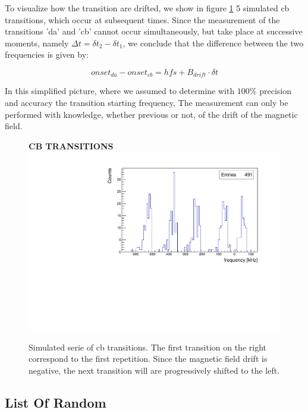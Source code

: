 \documentclass[11pt,a4paper,oneside]{article}
\newcommand{\commento}[1]{{\color{purple}{#1}}\vspace{10pt}}
\begin{document}
To visualize how the transition are drifted, we show in figure \ref{fig:MovingOnset} 5 simulated cb transitions, which occur at subsequent times. Since the measurement of the transitions 'da' and 'cb' cannot occur simultaneously, but take place at successive moments, namely $\Delta t = \delta t_{2} - \delta t_{1}$, we conclude that the difference between the two frequencies is given by:

\begin{equation} \label{eq:hfsmes}
onset_{da} - onset_{cb} = hfs + B_{drift} \cdot \delta t
\end{equation}


In this simplified picture, where we assumed to determine with $100 \%$ precision and accuracy the transition starting frequency, The measurement can only be performed with knowledge, whether previous or not, of the drift of the magnetic field.

\begin{figure}[!h]
\centering
\textbf{CB TRANSITIONS} \\
\includegraphics[width = 1\textwidth]{seriesoftransitions.pdf}
\caption[cb repetitions]{Simulated serie of cb transitions. The first transition on the right correspond to the first repetition. Since the magnetic field drift is negative, the next transition will are progressively shifted to the left.}
\label{fig:MovingOnset}
\end{figure}

\newpage
\subsection{List Of Random}
\commento{spiegare in dettaglio le motivazioni/come è stato implementato ogni random presente nella simulazione, e qualitativamente che effetto produce sui dati}
\end{document}
